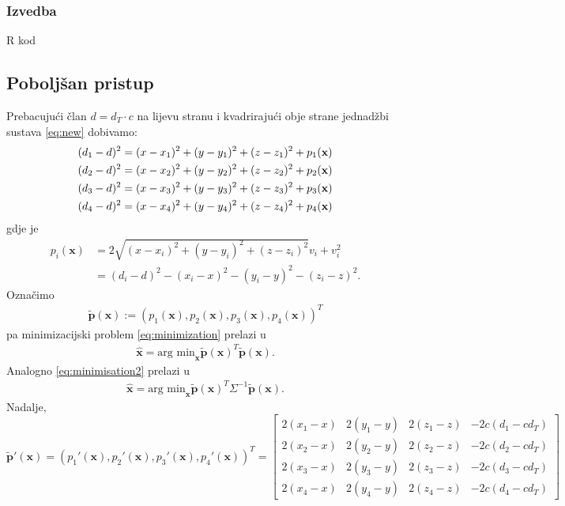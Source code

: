 \documentclass[a4paper,twoside,12pt]{memoir} %
\begin{document}
\subsubsection{Izvedba}
R kod

\subsection{Poboljšan pristup}
Prebacujući član $d=d_T \cdot c$ na lijevu stranu i kvadrirajući obje strane
jednadžbi sustava \ref{eq:new} dobivamo:
\begin{align}\label{eq:newIzvedba}
(d_1-d)^2 = (x-x_1)^{2}+(y-y_1)^{2}+(z-z_1)^{2} + p_1(\textbf{x})\notag \\
(d_2-d)^2 = (x-x_2)^{2}+(y-y_2)^{2}+(z-z_2)^{2} + p_2(\textbf{x})\\
(d_3-d)^2 = (x-x_3)^{2}+(y-y_3)^{2}+(z-z_3)^{2} + p_3(\textbf{x})\notag \\
(d_4-d)^2 = (x-x_4)^{2}+(y-y_4)^{2}+(z-z_4)^{2} + p_4(\textbf{x})\notag
\end{align}
gdje je 
\begin{align*}
p_i(\textbf{x}) & = 2\sqrt{(x-x_i)^{2}+(y-y_i)^{2}+(z-z_i)^{2}}v_i + v_i^2 \\
& = (d_i-d)^2 - (x_i-x)^{2} - (y_i-y)^{2} - (z_i-z)^{2}.
\end{align*}
Označimo 
\begin{align*} \mathbf{\tilde{p}}(\mathbf{x}) := (p_1(\textbf{x}),p_2(\textbf{x}),p_3(\textbf{x}),p_4(\textbf{x}))^T
\end{align*}
pa minimizacijski problem \ref{eq:minimization} prelazi u
\begin{align}\label{eq:minimisation3}
\hat{\mathbf{x}} = \text{arg min}_\mathbf{x} \mathbf{\tilde{p}}(\mathbf{x})^T\mathbf{\tilde{p}}(\mathbf{x}).
\end{align}
Analogno \ref{eq:minimisation2} prelazi u 
\begin{align}\label{eq:minimisation4}
\hat{\mathbf{x}} = \text{arg min}_\mathbf{x} \mathbf{\tilde{p}}(\mathbf{x})^T \Sigma ^{-1}\mathbf{\tilde{p}}(\mathbf{x}).
\end{align}
\vspace{0.5cm}
Nadalje, $$ \mathbf{\tilde{p}'}(\mathbf{x}) = (p_1'(\textbf{x}),p_2'(\textbf{x}),p_3'(\textbf{x}),p_4'(\textbf{x}))^T 
= \begin{bmatrix}
  2(x_1-x) &  2(y_1-y) &  2(z_1-z) & - 2c(d_1-cd_T)\\
  2(x_2-x) &  2(y_2-y) &  2(z_2-z) & - 2c(d_2-cd_T) \\
  2(x_3-x) &  2(y_3-y) &  2(z_3-z) & - 2c(d_3-cd_T) \\
  2(x_4-x) &  2(y_4-y) &  2(z_4-z) & - 2c(d_4-cd_T) 
\end{bmatrix}
$$
\end{document}
